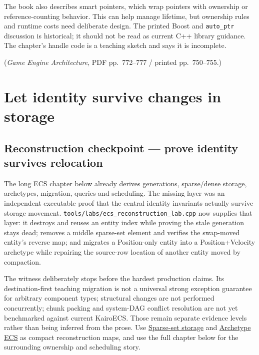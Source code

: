 The book also describes smart pointers, which wrap pointers with ownership or reference-counting behavior. This can help manage lifetime, but ownership rules and runtime costs need deliberate design. The printed Boost and \texttt{auto\_ptr} discussion is historical; it should not be read as current C++ library guidance. The chapter's handle code is a teaching sketch and says it is incomplete.

(\emph{Game Engine Architecture}, PDF pp.~772--777 / printed pp.~750--755.)

\section{Let identity survive changes in storage}\label{05-engine-i-ch014-let-identity-survive-changes-in-storage}

\hypertarget{05-engine-i-ch014-let-identity-survive-changes-in-storage}{}

\subsection{Reconstruction checkpoint --- prove identity survives relocation}\label{05-engine-i-ch014-reconstruction-checkpoint-prove-identity-survives-relocation}

\hypertarget{05-engine-i-ch014-reconstruction-checkpoint-prove-identity-survives-relocation}{}

The long ECS chapter below already derives generations, sparse/dense storage, archetypes, migration, queries and scheduling. The missing layer was an independent executable proof that the central identity invariants actually survive storage movement. \texttt{tools/labs/ecs\_reconstruction\_lab.cpp} now supplies that layer: it destroys and reuses an entity index while proving the stale generation stays dead; removes a middle sparse-set element and verifies the swap-moved entity's reverse map; and migrates a Position-only entity into a Position+Velocity archetype while repairing the source-row location of another entity moved by compaction.

The witness deliberately stops before the hardest production claims. Its destination-first teaching migration is not a universal strong exception guarantee for arbitrary component types; structural changes are not performed concurrently; chunk packing and system-DAG conflict resolution are not yet benchmarked against current KairoECS. Those remain separate evidence levels rather than being inferred from the prose. Use \hyperref[appendix-8404d0b1a3e7]{Sparse-set storage} and \hyperref[appendix-fbfeb0430008]{Archetype ECS} as compact reconstruction maps, and use the full chapter below for the surrounding ownership and scheduling story.

